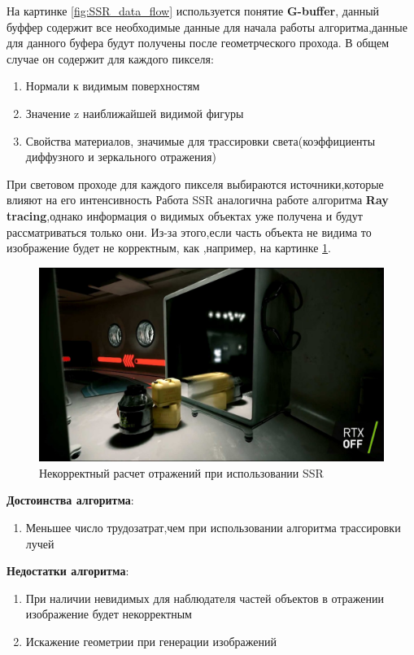 \documentclass[a4paper,14pt, unknownkeysallowed]{extreport}
\begin{document}
На картинке \ref{fig:SSR_data_flow} используется понятие \textbf{G-buffer}, данный буффер содержит все необходимые данные для начала работы алгоритма,данные для данного буфера
будут получены после геометрческого прохода. В общем случае он содержит для каждого пикселя:
\begin{enumerate}
	\item Нормали к видимым поверхностям
	\item Значение z наиближайшей видимой фигуры
	\item Свойства материалов, значимые для трассировки света(коэффициенты диффузного и зеркального отражения)
\end{enumerate}
При световом проходе для каждого пикселя выбираются источники,которые влияют на его интенсивность
Работа SSR аналогична работе алгоритма \textbf{Ray tracing},однако информация о видимых объектах уже получена и будут рассматриваться только они.
Из-за этого,если часть объекта не видима то изображение будет не корректным, как ,например, на картинке \ref{fig:SSR_fail}.\cite{SSR,reflexion_types}
\begin{figure}[H]
	\centering
	\includegraphics[scale=0.4]{SSR_fail.jpg}
	\caption{Некорректный расчет отражений при использовании SSR}
	\label{fig:SSR_fail}
\end{figure} 

\textbf{Достоинства алгоритма}:
\begin{enumerate}
	\item Меньшее число трудозатрат,чем при использовании алгоритма трассировки лучей
\end{enumerate}

\textbf{Недостатки алгоритма}:
\begin{enumerate}
	\item При наличии невидимых для наблюдателя частей объектов в отражении изображение будет некорректным
	\item Искажение геометрии при генерации изображений
\end{enumerate}
\end{document}
